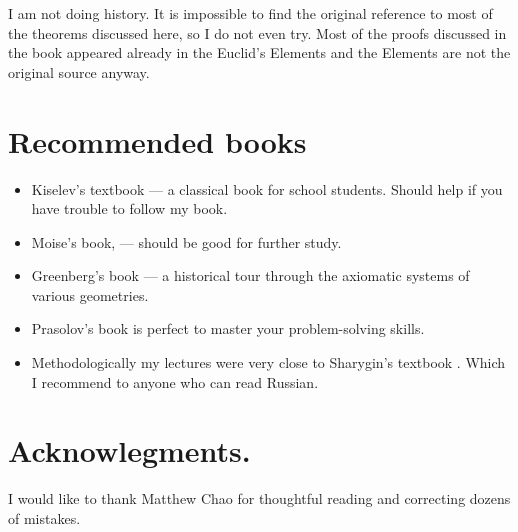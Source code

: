 I am not doing history.
It is  impossible to find the original reference to most of the theorems discussed here, so I do not even try.
Most of the proofs discussed in the book 
appeared already in the Euclid's Elements
and the  Elements are not the original source anyway.

\section*{Recommended books}

\begin{itemize}
\item Kiselev's textbook \cite{kiselev} ---
a classical book for school students.
Should help if you have trouble to follow my book.

\item Moise's book, \cite{moise} ---
should be good for further study.

\item Greenberg's book \cite{greenberg}  --- a historical tour through the axiomatic systems of various geometries.

\item Prasolov's book \cite{prasolov} is perfect to master your problem-solving skills. 

\item Methodologically my lectures
were very close to Sharygin's  textbook \cite{sharygin}.
Which I recommend to anyone who can read Russian.


\end{itemize}

\section*{Acknowlegments.}
I would like to thank  
Matthew Chao for thoughtful reading 
and correcting dozens of mistakes.








